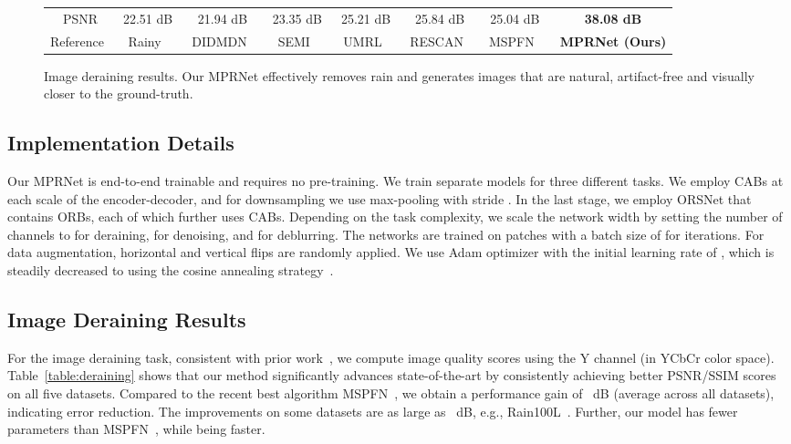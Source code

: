 \documentclass[10pt,twocolumn,letterpaper]{article}
\begin{document}
\begin{figure*}[!t]
\begin{center}
{\begin{tabular}[t]{c@{ }c@{ }c@{ }c@{ }c@{ }c@{ }c@{ }c}
\hspace{-4mm}\small~PSNR  &  \small~22.51 dB & \small~21.94 dB & \small~23.35 dB & \small~25.21 dB & \small~25.84 dB & \small~25.04 dB & \small~\textbf{38.08 dB}  \\
\hspace{-4mm} \small Reference  & \small Rainy & \small~DIDMDN~\cite{zhang2018density} & \small~SEMI~\cite{wei2019semi} & \small~UMRL~\cite{yasarla2019uncertainty}& \small~RESCAN~\cite{li2018recurrent} & \small~MSPFN~\cite{mspfn2020} & \small~\textbf{MPRNet (Ours)} \hspace{-2mm}
\end{tabular}}
\end{center}
\vspace*{-6mm}
\caption{\small Image deraining results. Our MPRNet effectively removes rain and generates images that are natural, artifact-free and visually closer to the ground-truth. 
}
\label{fig:deraining}
\vspace{-1.4em}
\end{figure*}


\subsection{Implementation Details}
Our MPRNet is end-to-end trainable and requires no pre-training.
We train separate models for three different tasks. We employ  CABs at each scale of the encoder-decoder, and for downsampling we use  max-pooling with stride . 
In the last stage, we employ ORSNet that contains  ORBs, each of which further uses  CABs. 
Depending on the task complexity, we scale the network width by setting the number of channels to  for deraining,  for denoising, and  for deblurring.
The networks are trained on   patches with a batch size of  for  iterations. 
For data augmentation, horizontal and vertical flips are randomly applied. We use Adam optimizer \cite{kingma2014adam} with the initial learning rate of , which is steadily decreased to  using the cosine annealing strategy~\cite{loshchilov2016sgdr}. 




\subsection{Image Deraining Results}
For the image deraining task, consistent with prior work~\cite{mspfn2020}, we compute image quality scores using the Y channel (in YCbCr color space). 
Table~\ref{table:deraining} shows that our method significantly advances state-of-the-art by consistently achieving better PSNR/SSIM scores on all five datasets.
Compared to the recent best algorithm MSPFN~\cite{mspfn2020}, we obtain a performance gain of ~dB (average across all datasets), indicating  error reduction. 
The improvements on some datasets are as large as ~dB,  e.g., Rain100L~\cite{yang2017deep}.
Further, our model has  fewer parameters than MSPFN~\cite{mspfn2020}, while being  faster.
\end{document}
